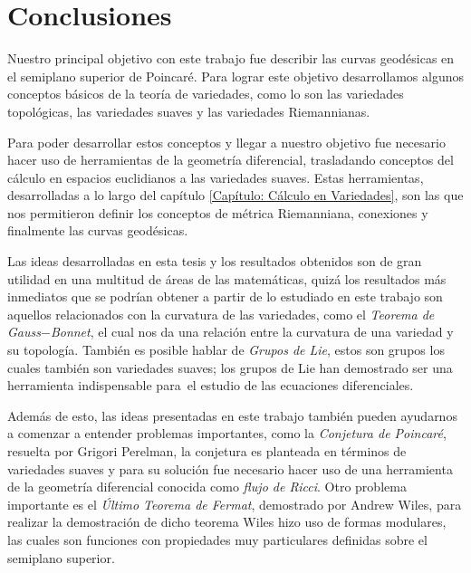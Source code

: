 \chapter{Conclusiones}
Nuestro principal objetivo con este trabajo fue describir las curvas geodésicas en el semiplano superior de Poincaré. Para lograr este objetivo desarrollamos algunos conceptos básicos de la teoría de variedades, como lo son las variedades topológicas, las variedades suaves y las variedades Riemannianas. 

Para poder desarrollar estos conceptos y llegar a nuestro objetivo fue necesario hacer uso de herramientas de la geometría diferencial, trasladando conceptos del cálculo en espacios euclidianos a las variedades suaves. Estas herramientas, desarrolladas a lo largo del capítulo \ref{Capítulo: Cálculo en Variedades}, son las que nos permitieron definir los conceptos de métrica Riemanniana, conexiones y finalmente las curvas geodésicas. 

Las ideas desarrolladas en esta tesis y los resultados obtenidos son de gran utilidad en una multitud de áreas de las matemáticas, quizá los resultados más inmediatos que se podrían obtener a partir de lo estudiado en este trabajo son aquellos relacionados con la curvatura de las variedades, como el \textit{Teorema de Gauss$-$Bonnet}, el cual nos da una relación entre la curvatura de una variedad y su topología. También es posible hablar de \textit{Grupos de Lie}, estos son grupos los cuales también son variedades suaves; los grupos de Lie han demostrado ser una herramienta indispensable para el estudio de las ecuaciones diferenciales. 

Además de esto, las ideas presentadas en este trabajo también pueden ayudarnos a comenzar a entender problemas importantes, como la \textit{Conjetura de Poincaré}, resuelta por Grigori Perelman, la conjetura es planteada en términos de variedades suaves y para su solución fue necesario hacer uso de una herramienta de la geometría diferencial conocida como \textit{flujo de Ricci}. Otro problema importante es el \textit{Último Teorema de Fermat}, demostrado por Andrew Wiles, para realizar la demostración de dicho teorema Wiles hizo uso de formas modulares, las cuales son funciones con propiedades muy particulares definidas sobre el semiplano superior. 
